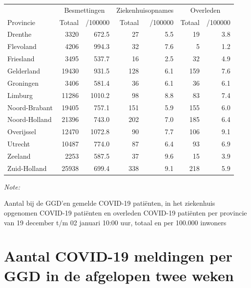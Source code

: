\documentclass[
  english,
  man,floatsintext]{apa6}
\begin{document}
\begin{table}[H]
\centering
\begin{threeparttable}
\begin{tabular}{lrrrrrr}
\toprule
\multicolumn{1}{c}{ } & \multicolumn{2}{c}{Besmettingen} & \multicolumn{2}{c}{Ziekenhuisopnames} & \multicolumn{2}{c}{Overleden} \\
\cmidrule(l{3pt}r{3pt}){2-3} \cmidrule(l{3pt}r{3pt}){4-5} \cmidrule(l{3pt}r{3pt}){6-7}
Provincie & Totaal & /100000 & Totaal & /100000 & Totaal & /100000\\
\midrule
Drenthe & 3320 & 672.5 & 27 & 5.5 & 19 & 3.8\\
Flevoland & 4206 & 994.3 & 32 & 7.6 & 5 & 1.2\\
Friesland & 3495 & 537.7 & 16 & 2.5 & 32 & 4.9\\
Gelderland & 19430 & 931.5 & 128 & 6.1 & 159 & 7.6\\
Groningen & 3406 & 581.4 & 36 & 6.1 & 36 & 6.1\\
Limburg & 11286 & 1010.2 & 98 & 8.8 & 83 & 7.4\\
Noord-Brabant & 19405 & 757.1 & 151 & 5.9 & 155 & 6.0\\
Noord-Holland & 21396 & 743.0 & 202 & 7.0 & 185 & 6.4\\
Overijssel & 12470 & 1072.8 & 90 & 7.7 & 106 & 9.1\\
Utrecht & 10487 & 774.0 & 87 & 6.4 & 93 & 6.9\\
Zeeland & 2253 & 587.5 & 37 & 9.6 & 15 & 3.9\\
Zuid-Holland & 25938 & 699.4 & 338 & 9.1 & 218 & 5.9\\
\bottomrule
\end{tabular}
\begin{tablenotes}
\item \textit{Note: } 
\item Aantal bij de GGD’en gemelde COVID-19 patiënten, in het ziekenhuis opgenomen COVID-19 patiënten en overleden COVID-19 patiënten per provincie van 19 december t/m 02 januari 10:00 uur, totaal en per 100.000 inwoners
\end{tablenotes}
\end{threeparttable}
\end{table}

\newpage

\hypertarget{aantal-covid-19-meldingen-per-ggd-in-de-afgelopen-twee-weken}{%
\section{Aantal COVID-19 meldingen per GGD in de afgelopen twee weken}\label{aantal-covid-19-meldingen-per-ggd-in-de-afgelopen-twee-weken}}
\end{document}
